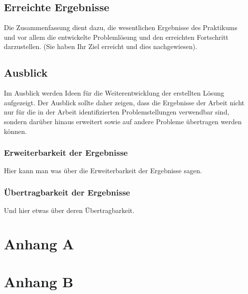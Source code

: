 \section{Erreichte Ergebnisse}
\label{sec:ergebnisse}

Die Zusammenfassung dient dazu, die wesentlichen Ergebnisse des 
Praktikums und vor allem die entwickelte Problemlösung und den 
erreichten Fortschritt darzustellen. (Sie haben Ihr Ziel erreicht und 
dies nachgewiesen).

\section{Ausblick}
\label{sec:ausblick}

Im Ausblick werden Ideen für die Weiterentwicklung der erstellten Lösung 
aufgezeigt. Der Ausblick sollte daher zeigen, dass die Ergebnisse der 
Arbeit nicht nur für die in der Arbeit identifizierten Problemstellungen 
verwendbar sind, sondern darüber hinaus erweitert sowie auf andere 
Probleme übertragen werden können.

\subsection{Erweiterbarkeit der Ergebnisse}
\label{sub:erweiterbarkeit}

Hier kann man was über die Erweiterbarkeit der Ergebnisse sagen.

\subsection{Übertragbarkeit der Ergebnisse}
\label{sub:uebertragbarkeit}

Und hier etwas über deren Übertragbarkeit.

\appendix

\printbibliography[heading=bibintoc]

\chapter{Anhang A}

\chapter{Anhang B}


